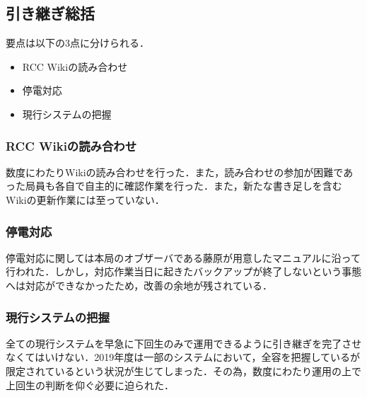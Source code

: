 \subsection*{引き継ぎ総括}


要点は以下の3点に分けられる．
 \begin{itemize}
\item RCC Wikiの読み合わせ
\item 停電対応
\item 現行システムの把握
 \end{itemize}
\subsubsection* {RCC Wikiの読み合わせ}
数度にわたりWikiの読み合わせを行った．また，読み合わせの参加が困難であった局員も各自で自主的に確認作業を行った．また，新たな書き足しを含むWikiの更新作業には至っていない．
\subsubsection* {停電対応}
停電対応に関しては本局のオブザーバである藤原が用意したマニュアルに沿って行われた．しかし，対応作業当日に起きたバックアップが終了しないという事態へは対応ができなかったため，改善の余地が残されている．
\subsubsection* {現行システムの把握}
全ての現行システムを早急に下回生のみで運用できるように引き継ぎを完了させなくてはいけない．2019年度は一部のシステムにおいて，全容を把握している\systemStaff{}が限定されているという状況が生じてしまった．その為，数度にわたり運用の上で上回生の判断を仰ぐ必要に迫られた．